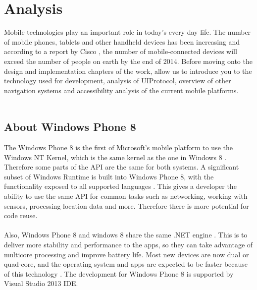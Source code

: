 \chapter{Analysis}
Mobile technologies play an important role in today's every day life. The number of mobile phones, tablets and other handheld devices has been increasing and according to a report by Cisco \cite{cisco}, the number of mobile-connected devices will exceed the number of people on earth by the end of 2014.
Before moving onto the design and implementation chapters of the work, allow us to introduce you to the technology used for development, analysis of UIProtocol, overview of other navigation systems and accessibility analysis of the current mobile platforms.\\\\



\section{About Windows Phone 8}
The Windows Phone 8 is the first of Microsoft's mobile platform to use the Windows NT Kernel, which is the same kernel as the one in Windows 8 \cite{wp8kernel}. Therefore some parts of the API are the same for both systems. A significant subset of Windows Runtime is built into Windows Phone 8, with the functionality exposed to all supported languages \cite{wp8comparison}. This gives a developer the ability to use the same API for common tasks such as networking, working with sensors, processing location data and more. Therefore there is more potential for code reuse.\\\\
Also, Windows Phone 8 and windows 8 share the same .NET engine \cite{wp8comparison}. This is to deliver more stability and performance to the apps, so they can take advantage of multicore processing and improve battery life. Most new devices are now dual or quad-core, and the operating system and apps are expected to be faster because of this technology \cite{wp8comparison}. The development for Windows Phone 8 is supported by Visual Studio 2013 IDE.

